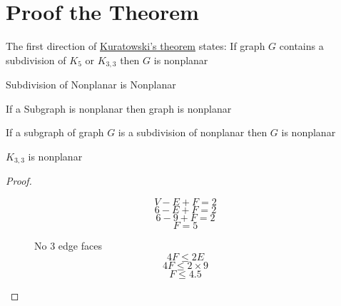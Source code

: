 \section{Proof the Theorem}
The first direction of \hyperref[thr:kuratowski]{Kuratowski's theorem} states: If graph $G$ contains a subdivision of $K_5$ or $K_{3,3}$ then $G$ is nonplanar

Subdivision of Nonplanar is Nonplanar

If a Subgraph is nonplanar then graph is nonplanar

If a subgraph of graph $G$ is a subdivision of nonplanar then $G$ is nonplanar
\begin{lemma}
    $K_{3,3}$ is nonplanar
\end{lemma}

\begin{proof}
    \begin{figure}[H]
        \begin{minipage}{0.3\textwidth}
            $$V-E+F=2$$
            $$6-E+F=2$$
            $$6-9+F=2$$
            $$F=5$$
        \end{minipage}
        \hfill
        \begin{minipage}{0.35\textwidth}
            \centering
        \end{minipage}
        \hfill
        \begin{minipage}{0.3\textwidth}
            \centering
            No 3 edge faces
            $$4F \leq 2E$$
            $$4F \leq 2 \times 9$$
            $$ F \leq 4.5$$
        \end{minipage}
    \end{figure}
\end{proof}

